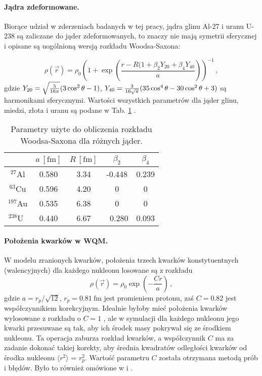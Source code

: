 \documentclass[a4paper,12pt]{article}
\begin{document}
\paragraph{Jądra zdeformowane.}
Biorące udział w zderzeniach badanych w tej pracy, jądra glinu Al-27 i uranu U-238 są zaliczane do jąder zdeformowanych, to znaczy nie mają symetrii sferycznej i opisane są uogólnioną wersją rozkładu Woodsa-Saxona:

\begin{equation}
\rho(\vec{r})=\rho_0\left({1+\exp\left(\frac{r-R(1+\beta_2Y_{20}+\beta_4Y_{40}}{a}\right)}\right)^{-1}\,,
\end{equation}
gdzie $Y_{20}=\sqrt{ 5\over{16\pi}}(3\cos^{2}\theta-1)$, $Y_{40}={ 3\over {16\sqrt{\pi}}}(35\cos^{4}\theta-30\cos^{2}\theta+3)$ są harmonikami sferycznymi. Wartości wszystkich parametrów dla jąder glinu, miedzi, złota i uranu są podane w Tab. \ref{table0}  \cite{Loizides:2014vua,DeJager:1987qc}.

\begin{table}[h!]
\begin{center}
\begin{tabular}{|c|c|c|c|c|} \hline
 & $a~[\mathrm{fm}]$ & $R~[\mathrm{fm}]$ & $\beta_2$ & $\beta_4$ \\ \hline
$^{27 }\!$Al     & 0.580 & 3.34 & -0.448 & 0.239 \\ \hline
$^{63 }  $Cu     & 0.596 & 4.20 &  0     &  0    \\ \hline
$^{197}\!$Au     & 0.535 & 6.38 &  0     &  0    \\ \hline
$^{238}  $U$~~$  & 0.440 & 6.67 & ~0.280 & 0.093 \\ \hline
\end{tabular}
\caption{\label{table0} 
Parametry użyte do obliczenia rozkładu Woodsa-Saxona dla różnych jąder.}
\end{center}
\end{table}

\paragraph{Położenia kwarków w WQM.}
W modelu zranionych kwarków, położenia trzech kwarków konstytuentnych (walencyjnych) dla każdego nukleonu losowane są z rozkładu
\begin{equation}\label{eq:eq-quark-distr}
\rho(\vec{r})=\rho_0\exp\left(-\frac{Cr}{a}\right)\,,
\end{equation}
gdzie $a={r_p}/{\sqrt{12}}$, $r_p=0.81~\mathrm{fm}$ jest promieniem protonu, zaś $C=0.82$ jest współczynnikiem korekcyjnym. Idealnie byłoby mieć położenia kwarków wylosowane z rozkładu o $C=1$ \cite{Adler:2013aqf,Hofstadter:1956qs}, ale w symulacji dla każdego nukleonu jego kwarki przesuwane są tak, aby ich środek masy pokrywał się ze środkiem nukleonu. Ta operacja zaburza rozkład kwarków, a współczynnik $C$ ma za zadanie dokonać takiej korekty, aby średnia kwadratów odległości kwarków od środka nukleonu $\langle r^2 \rangle$  = $r_p^2$. Wartość parametru $C$ została otrzymana metodą prób i błędów. Było to również omówione w \cite{Barej:pracaInz18} i \cite{Barej:2017kcw}.
\end{document}

